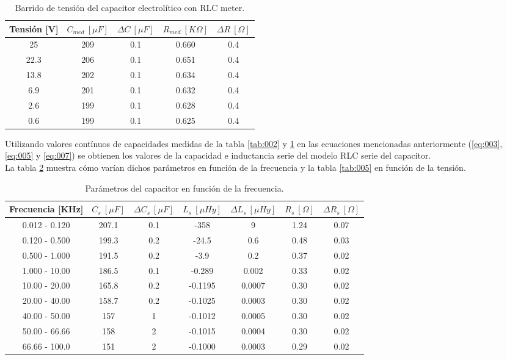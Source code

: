 \documentclass[a4paper,10pt]{article}
\begin{document}
		\begin{table}[!htp]
			\centering
			\begin{tabular}{|c|c|c|c|c|}
				\hline
				Tensión [V] & $C_{med}~[\mu F]$ & $\Delta C~[\mu F]$ & 
				$R_{med}~[K\Omega]$ & $\Delta R~[\Omega]$\\
				\hline
				25 &	209 & 0.1 & 0.660 & 0.4 \\
				\hline
				22.3 &	206 & 0.1 & 0.651 & 0.4 \\
				\hline
				13.8 &	202 & 0.1 & 0.634 & 0.4 \\
				\hline
				6.9 &	201 & 0.1 & 0.632 & 0.4 \\
				\hline
				2.6 &	199 & 0.1 & 0.628 & 0.4 \\
				\hline
				0.6 &	199 & 0.1 & 0.625 & 0.4 \\
				\hline	  
			\end{tabular}
			\caption{Barrido de tensión del capacitor electrolítico con RLC 
			meter.} 
			\label{tab:003}
		\end{table}	

		\indent Utilizando valores contínuos de capacidades medidas de la tabla
		\ref{tab:002} y \ref{tab:003} en las ecuaciones mencionadas anteriormente
		(\ref{eq:003}, \ref{eq:005} y \ref{eq:007}) se obtienen los valores de
		la capacidad e inductancia serie del modelo RLC serie del capacitor. \\
		\indent La tabla \ref{tab:004} muestra cómo varían dichos parámetros en 
		función de la frecuencia y la tabla \ref{tab:005} en función de la 
		tensión.
		
		\begin{table}[!htp]
			\centering
			\begin{tabular}{|c|c|c|c|c|c|c|}
				\hline
				Frecuencia [KHz] & $C_s~[\mu F]$ & $\Delta C_s~[\mu F]$ & 
				$L_s~[\mu Hy]$  & $\Delta L_s~[\mu Hy]$  & $R_s~[\Omega]$ & 
				$\Delta R_s~[\Omega]$ \\
				\hline
				0.012 - 0.120 &	207.1 & 0.1 & -358 & 9 & 1.24 & 0.07 \\
				\hline
				0.120 - 0.500 &	199.3 & 0.2 & -24.5 & 0.6 & 0.48 & 0.03 \\
				\hline
				0.500 - 1.000 &	191.5 & 0.2 & -3.9 & 0.2 & 0.37 & 0.02 \\
				\hline
				1.000 - 10.00 &	186.5 & 0.1 & -0.289 & 0.002 & 0.33 & 0.02 \\
				\hline
				10.00 - 20.00 &	165.8 & 0.2 & -0.1195 & 0.0007 & 0.30 & 0.02 \\
				\hline
				20.00 - 40.00 &	158.7 & 0.2 & -0.1025 & 0.0003 & 0.30 & 0.02 \\
				\hline
				40.00 - 50.00 &	157 & 1 & -0.1012 & 0.0005 & 0.30 & 0.02 \\
				\hline
				50.00 - 66.66 &	158 & 2 & -0.1015 & 0.0004 & 0.30 & 0.02 \\
				\hline
				66.66 - 100.0 &	151 & 2 & -0.1000 & 0.0003 & 0.29 & 0.02 \\
				\hline	  
			\end{tabular}
			\caption{Parámetros del capacitor en función de la frecuencia.} 
			\label{tab:004}
		\end{table}	
		
\end{document}
